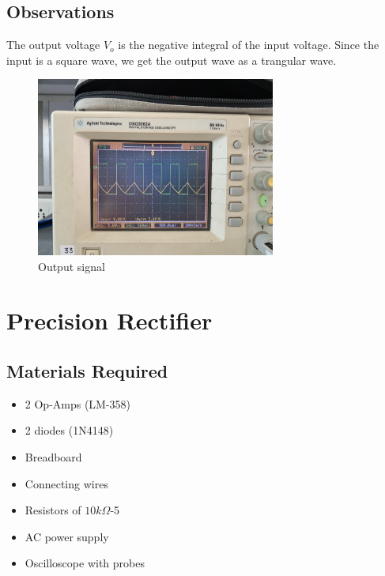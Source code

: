 \documentclass[a4paper,12pt]{article}
\begin{document}
\subsection{Observations}
 The output voltage $V_o$ is the negative integral of the input voltage.
 Since the input is a square wave, we get the output wave as a trangular wave.
\begin{figure}[H]
    \centering
    \includegraphics[width=0.7\textwidth]{fig/rc.jpeg} %
    \caption{Output signal}
\end{figure}

\section{ Precision Rectifier}

\subsection{Materials Required}
\begin{itemize}
    \item 2 Op-Amps (LM-358)
    \item 2 diodes (1N4148)
    \item Breadboard
    \item Connecting wires
    \item Resistors of $10k\Omega$-5
    \item AC power supply
    \item Oscilloscope with probes
\end{itemize}
\end{document}
